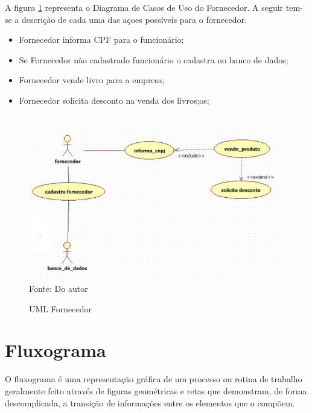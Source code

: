 A figura \ref{uml_fornecedor} representa o Diagrama de Casos de Uso do
Fornecedor. A seguir tem-se a descrição de cada uma das açoes possíveis para
o fornecedor.

\begin{itemize}
\item Fornecedor informa CPF para o funcionário;
\item Se Fornecedor não cadastrado funcionário o cadastra no banco de dados;
\item Fornecedor vende livro para a empresa;
\item Fornecedor solicita desconto na venda dos livros;os;
\end{itemize}

\begin{figure}[h]
	\centering 
	\caption{UML Fornecedor}
	\label{uml_fornecedor}
	\includegraphics[scale = 0.70]{imagens/uml-fornecedor.jpg}
	\\Fonte: Do autor
\end{figure}





\newpage
\section{Fluxograma}

O fluxograma é uma representação gráfica de um processo ou rotina de trabalho geralmente feito através de figuras geométricas e retas que demonstram, de forma descomplicada, a transição de informações entre os elementos que o compõem.

